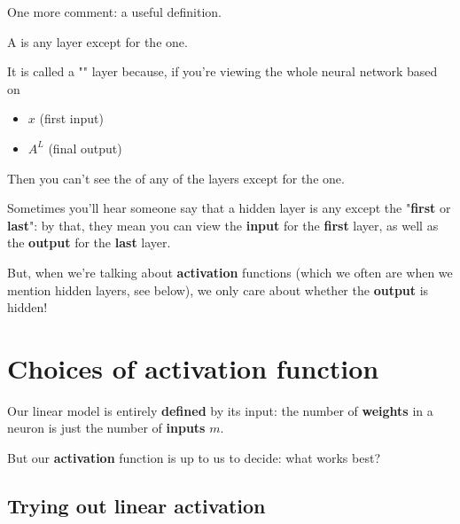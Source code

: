         One more comment: a useful definition.\\
        
        \begin{definition}
            A  is any layer except for the  one.
            
            It is called a "" layer because, if you're viewing the whole neural network based on
            
            \begin{itemize}
                \item {} $x$ (first input)
                
                \item {} $A^L$ (final output)
            \end{itemize}
            
            Then you can't see the  of any of the layers except for the  one.
        \end{definition}
        
        Sometimes you'll hear someone say that a hidden layer is any except the "\textbf{first} or \textbf{last}": by that, they mean you can view the \textbf{input} for the \textbf{first} layer, as well as the \textbf{output} for the \textbf{last} layer.

        But, when we're talking about \textbf{activation} functions (which we often are when we mention hidden layers, see below), we only care about whether the \textbf{output} is hidden!
        
        
    
\pagebreak
\section{Choices of activation function}

    Our linear model is entirely \textbf{defined} by its input: the number of \textbf{weights} in a neuron is just the number of \textbf{inputs} $m$.
    
    But our \textbf{activation} function is up to us to decide: what works best?
    
    \subsection{Trying out linear activation}
        

